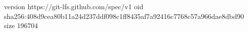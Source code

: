 version https://git-lfs.github.com/spec/v1
oid sha256:408d9cea80b11a24d237ddf098c1ff8435af7a92416c7768c57a966dae8dbd90
size 196704
